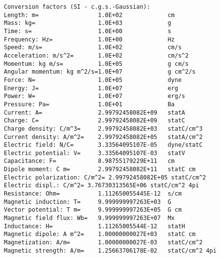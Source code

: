 \documentclass[12pt,a4paper,twoside]{report}
\begin{document}
{\begin{tcolorbox}
\begin{verbatim}
Conversion factors (SI - c.g.s.-Gaussian):
Length: m=                 1.0E+02             cm
Mass: kg=                  1.0E+03             g
Time: s=                   1.0E+00             s
Frequency: Hz=             1.0E+00             Hz
Speed: m/s=                1.0E+02             cm/s
Acceleration: m/s^2=       1.0E+02             cm/s^2
Momentum: kg m/s=          1.0E+05             g cm/s
Angular momentum: kg m^2/s=1.0E+07             g cm^2/s
Force: N=                  1.0E+05             dyne
Energy: J=                 1.0E+07             erg
Power: W=                  1.0E+07             erg/s
Pressure: Pa=              1.0E+01             Ba
Current: A=                2.99792458082E+09   statA
Charge: C=                 2.99792458082E+09   statC
Charge density: C/m^3=     2.99792458082E+03   statC/cm^3
Current density: A/m^2=    2.99792458082E+05   statA/cm^2
Electric field: N/C=       3.33564095107E-05   dyne/statC
Electric potential: V=     3.33564095107E-03   statV
Capacitance: F=            8.98755179229E+11   cm
Dipole moment: C m=        2.99792458082E+11   statC cm
Electric polarization: C/m^2= 2.99792458082E+05 statC/cm^2
Electric displ.: C/m^2= 3.76730313565E+06 statC/cm^2 4pi
Resistance: Ohm=           1.112650055445E-12  s/cm
Magnetic induction: T=     9.999999997263E+03  G
Vector potential: T m=     9.999999997263E+05  G cm
Magnetic field flux: Wb=   9.999999997263E+07  Mx
Inductance: H=             1.11265005544E-12   statH
Magnetic dipole: A m^2=    1.00000000027E+03   statC cm
Magnetization: A/m=        1.00000000027E-03   statC/cm^2
Magnetic strength: A/m=    1.25663706178E-02   statC/cm^2 4pi


\end{verbatim}
\end{tcolorbox}}
\end{document}
